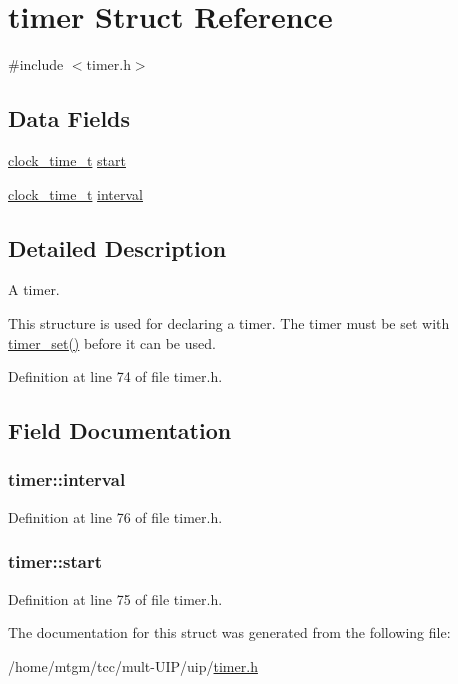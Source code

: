 \hypertarget{structtimer}{
\section{timer Struct Reference}
\label{structtimer}
}


{\ttfamily \#include $<$timer.h$>$}

\subsection*{Data Fields}
\begin{DoxyCompactItemize}
\item 
\hyperlink{clock-arch_8h_a42fc7b708ad04499c436158fd5f37ed4}{clock\_\-time\_\-t} \hyperlink{structtimer_ae8eb428c05bc1dee022246a3063d277c}{start}
\item 
\hyperlink{clock-arch_8h_a42fc7b708ad04499c436158fd5f37ed4}{clock\_\-time\_\-t} \hyperlink{structtimer_afe557d333c06cf65f52023f45f5b0a3a}{interval}
\end{DoxyCompactItemize}


\subsection{Detailed Description}
A timer.

This structure is used for declaring a timer. The timer must be set with \hyperlink{group__timer_ga6614d96fdfcd95c95ec6e6f63071ff51}{timer\_\-set()} before it can be used. 

Definition at line 74 of file timer.h.



\subsection{Field Documentation}
\hypertarget{structtimer_afe557d333c06cf65f52023f45f5b0a3a}{
\subsubsection[{interval}]{ {\bf timer::interval}}}
\label{structtimer_afe557d333c06cf65f52023f45f5b0a3a}


Definition at line 76 of file timer.h.

\hypertarget{structtimer_ae8eb428c05bc1dee022246a3063d277c}{
\subsubsection[{start}]{ {\bf timer::start}}}
\label{structtimer_ae8eb428c05bc1dee022246a3063d277c}


Definition at line 75 of file timer.h.



The documentation for this struct was generated from the following file:\begin{DoxyCompactItemize}
\item 
/home/mtgm/tcc/mult-\/UIP/uip/\hyperlink{uip_2timer_8h}{timer.h}\end{DoxyCompactItemize}
